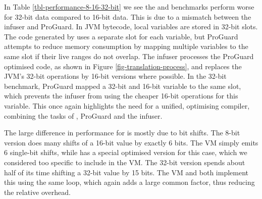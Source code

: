 In Table \ref{tbl-performance-8-16-32-bit} we see the  and  benchmarks perform worse for 32-bit data compared to 16-bit data. This is due to a mismatch between the infuser and ProGuard. In JVM bytecode, local variables are stored in 32-bit slots. The code generated by  uses a separate slot for each variable, but ProGuard attempts to reduce memory consumption by mapping multiple variables to the same slot if their live ranges do not overlap. The infuser processes the ProGuard optimised code, as shown in Figure \ref{fig-translation-process}, and replaces the JVM's 32-bit operations by 16-bit versions where possible. In the 32-bit  benchmark, ProGuard mapped a 32-bit and 16-bit variable to the same slot, which prevents the infuser from using the cheaper 16-bit operations for this variable. This once again highlights the need for a unified, optimising compiler, combining the tasks of , ProGuard and the infuser.

The large difference in performance for  is mostly due to bit shifts. The 8-bit version does many shifts of a 16-bit value by exactly 6 bits. The VM simply emits 6 single-bit shifts, while  has a special optimised version for this case, which we considered too specific to include in the VM. The 32-bit version spends about half of its time shifting a 32-bit value by 15 bits. The VM and  both implement this using the same loop, which again adds a large common factor, thus reducing the relative overhead.


